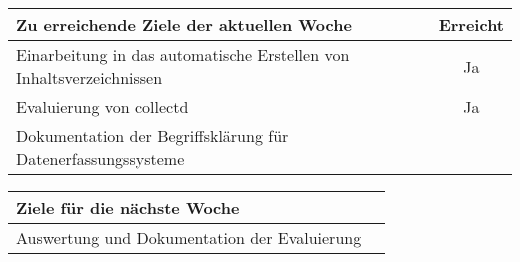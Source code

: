 \begin{tabularx}{\textwidth}{Xc}
    \arrayrulecolor{OliveGreen}
    \toprule
    {\bfseries Zu erreichende Ziele der aktuellen Woche} & {\bfseries Erreicht} \\
    \midrule[2pt]
    Einarbeitung in das automatische Erstellen von Inhaltsverzeichnissen &Ja    \\
    \rowcolor{OliveGreen!15}
    Evaluierung von collectd                             &Ja                    \\
    \rowcolor{White}
    Dokumentation der Begriffsklärung für Datenerfassungssysteme &              \\
    \bottomrule[2pt]
\end{tabularx}
%
\vspace{1cm}
%
\begin{tabularx}{\textwidth}{Xc}
    \arrayrulecolor{OliveGreen}
    \toprule
    {\bfseries Ziele für die nächste Woche}              &                      \\
    \midrule[2pt]
    Auswertung und Dokumentation der Evaluierung &      \\
\end{tabularx}
